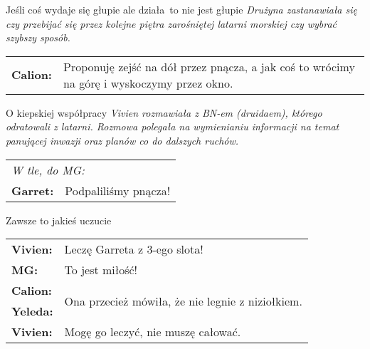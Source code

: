 \documentclass[10pt,twoside,twocolumn]{book}
\begin{document}
\begin{rpg-quotebox}{Jeśli coś wydaje się głupie ale działa\, to nie jest głupie}
   \textit{Drużyna zastanawiała się czy przebijać się przez kolejne piętra zarośniętej latarni morskiej czy wybrać szybszy sposób.}\\

   \begin{tabularx}{\columnwidth}{lX}
      \textbf{Calion:} & Proponuję zejść na dół przez pnącza, a jak coś to wrócimy na górę i wyskoczymy przez okno.\\
   \end{tabularx}
\end{rpg-quotebox}

\begin{rpg-quotebox}{O kiepskiej współpracy}
   \textit{Vivien rozmawiała z BN-em (druidaem), którego odratowali z latarni. Rozmowa polegała na wymienianiu informacji na temat panującej inwazji oraz planów co do dalszych ruchów.}\\
   
   \begin{tabularx}{\columnwidth}{lX}
      \multicolumn{2}{l}{\textit{W tle, do MG:}}\\
      \textbf{Garret:} & Podpaliliśmy pnącza!\\
   \end{tabularx}
\end{rpg-quotebox}

\begin{rpg-quotebox}{Zawsze to jakieś uczucie}
   \begin{tabularx}{\columnwidth}{lX}
      \textbf{Vivien:} & Leczę Garreta z 3-ego slota!\\
      \textbf{MG:} & To jest miłość!\\
      \textbf{Calion:} & \multirow{2}{*}{Ona przecież mówiła, że nie legnie z niziołkiem.}\\
      \textbf{Yeleda:} & \\
      \textbf{Vivien:} & Mogę go leczyć, nie muszę całować.\\
   \end{tabularx}
\end{rpg-quotebox}
\end{document}
